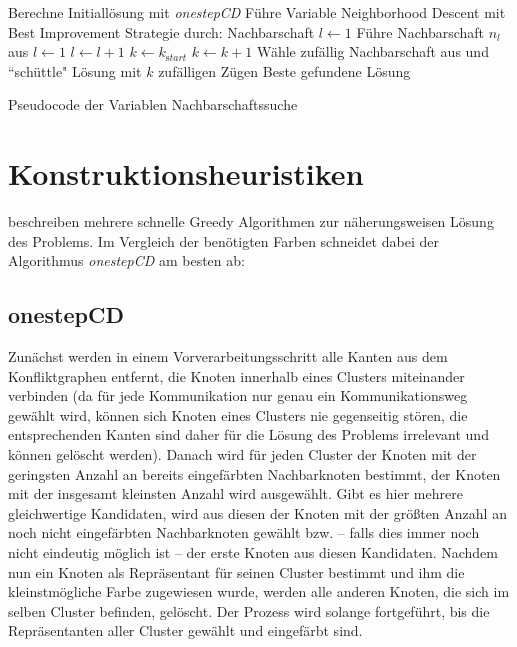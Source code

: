 \begin{algorithm}
\begin{algorithmic}[1]
\State Berechne Initiallösung mit \emph{onestepCD}
\State Führe Variable Neighborhood Descent mit Best Improvement Strategie durch:
\State Nachbarschaft $l \leftarrow 1$
\State Führe Nachbarschaft $n_l$ aus
\State  $l\leftarrow 1$  
\Else
\State  $l\leftarrow l + 1$
\EndIf
\EndWhile
{}
\State $k \leftarrow k_{\mathrm start}$ 
\Else
\State $k \leftarrow k + 1$
\EndIf
\State Wähle zufällig Nachbarschaft aus und ``schüttle" Lösung mit $k$ zufälligen Zügen
\EndWhile
\State\Return Beste gefundene Lösung
\end{algorithmic}
\caption{Pseudocode der Variablen Nachbarschaftssuche}
\end{algorithm}

\section{Konstruktionsheuristiken}
\label{sec:construct}
\citet*{Li2000} beschreiben mehrere schnelle Greedy Algorithmen zur näherungsweisen Lösung des Problems. Im Vergleich der benötigten Farben schneidet dabei der Algorithmus \emph{onestepCD} am besten ab:
\subsection{onestepCD}
Zunächst werden in einem Vorverarbeitungsschritt alle Kanten aus dem Konfliktgraphen entfernt, die Knoten innerhalb eines Clusters miteinander verbinden (da für jede Kommunikation nur genau ein Kommunikationsweg gewählt wird, können sich Knoten eines Clusters nie gegenseitig stören, die entsprechenden Kanten sind daher für die Lösung des Problems irrelevant und können gelöscht werden). Danach wird für jeden Cluster der Knoten mit der geringsten Anzahl an bereits eingefärbten Nachbarknoten bestimmt, der Knoten mit der insgesamt kleinsten Anzahl wird ausgewählt. Gibt es hier mehrere gleichwertige Kandidaten, wird aus diesen der Knoten mit der größten Anzahl an noch nicht eingefärbten Nachbarknoten gewählt bzw. -- falls dies immer noch nicht eindeutig möglich ist -- der erste Knoten aus diesen Kandidaten. Nachdem nun ein Knoten als Repräsentant für seinen Cluster bestimmt und ihm die kleinstmögliche Farbe zugewiesen wurde, werden alle anderen Knoten, die sich im selben Cluster befinden, gelöscht. Der Prozess wird solange fortgeführt, bis die Repräsentanten aller Cluster gewählt und eingefärbt sind.

